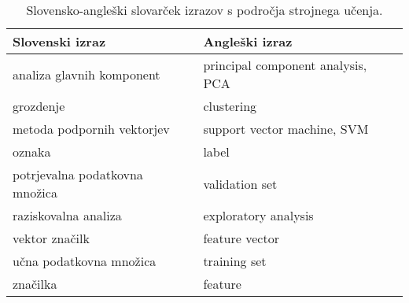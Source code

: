 \begin{table}[ht]
	\centering
	\begin{tabular}{ll}
		\hline
		\textbf{Slovenski izraz} & \textbf{Angleški izraz} \\
		\hline
		analiza glavnih komponent & principal component analysis, PCA \\
		grozdenje & clustering \\
		metoda podpornih vektorjev & support vector machine, SVM \\
		oznaka & label \\
		potrjevalna podatkovna množica & validation set \\
		raziskovalna analiza & exploratory analysis \\
		vektor značilk & feature vector \\
		učna podatkovna množica & training set \\		
		značilka & feature \\
	\end{tabular}
	\caption{Slovensko-angleški slovarček izrazov s področja strojnega učenja.}
	\label{slovar}
\end{table}
